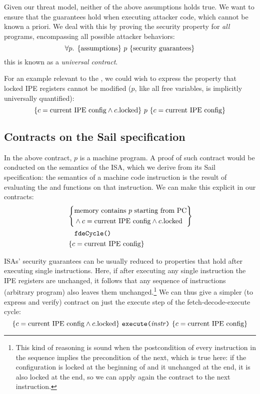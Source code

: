 Given our threat model, neither of the above assumptions holds true. We want to ensure that the guarantees hold when executing attacker code, which cannot be known a priori. We deal with this by proving the security property for \emph{all} programs, encompassing all possible attacker behaviors:
\[ \forall p.\; \hoare{\text{assumptions}}{p}{\text{security guarantees}} \]
this is known as a \emph{universal contract}.

For an example relevant to the \msp, we could wish to express the property that locked IPE registers cannot be modified (\(p\), like all free variables, is implicitly universally quantified):
\[ \hoare
  {c = \text{current IPE config} \wedge c.\mathrm{locked}}
  {p}
  {c = \text{current IPE config}} \]

\subsection{Contracts on the Sail specification}

In the above contract, \(p\) is a \msp machine program. A proof of such contract would be conducted on the semantics of the \msp ISA, which we derive from its Sail specification: the semantics of a machine code instruction is the result of evaluating the  and  functions on that instruction. We can make this explicit in our contracts:
\[ \hoarem
  {\begin{aligned}
    &\text{memory contains \(p\) starting from PC} \\
    &{}\wedge c = \text{current IPE config} \wedge c.\mathrm{locked}
  \end{aligned}}
  {\texttt{fdeCycle()}}
  {c = \text{current IPE config}} \]

ISAs' security guarantees can be usually reduced to properties that hold after executing single instructions. Here, if after executing any single instruction the IPE registers are unchanged, it follows that any sequence of instructions (\ie arbitrary program) also leaves them unchanged.\footnote{This kind of reasoning is sound when the postcondition of every instruction in the sequence implies the precondition of the next, which is true here: if the configuration is locked at the beginning of  and it unchanged at the end, it is also locked at the end, so we can apply again the contract to the next instruction.} We can thus give a simpler (to express and verify) contract on just the execute step of the fetch-decode-execute cycle:
\[ \hoare
  {c = \text{current IPE config} \wedge c.\mathrm{locked}}
  {\texttt{execute(\(\mathit{instr}\))}}
  {c = \text{current IPE config}} \]

